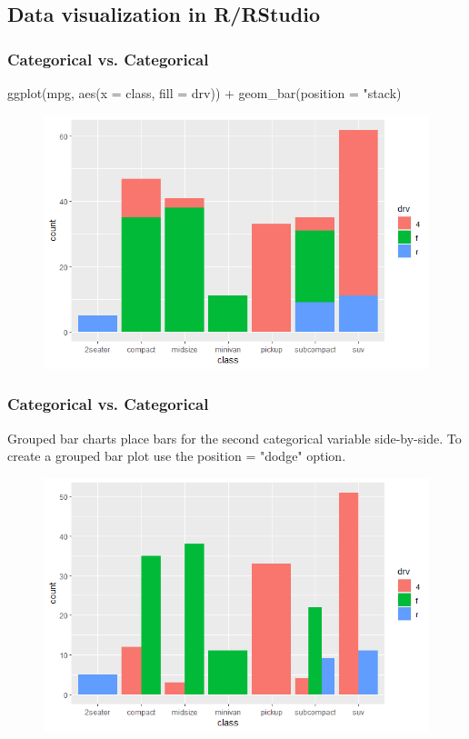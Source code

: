 \documentclass{beamer}
\begin{document}
\subsection{Data visualization in R/RStudio} 

\begin{frame}[fragile] %
\frametitle{Categorical vs. Categorical}

\begin{example} 
ggplot(mpg, 
       aes(x = class, 
           fill = drv)) + 
  geom_bar(position = "stack)
\end{example}
\begin{figure}
\includegraphics[width=0.8\linewidth]{Seminar_3_images/R/01.png}
\end{figure}
\end{frame}
\begin{frame}[fragile] %
\frametitle{Categorical vs. Categorical}

\begin{example} 
Grouped bar charts place bars for the second categorical variable side-by-side. To create a grouped bar plot use the position = "dodge" option.
\end{example}
\begin{figure}
\includegraphics[width=0.7\linewidth]{Seminar_3_images/R/02.png}
\end{figure}
\end{frame}
\end{document}
